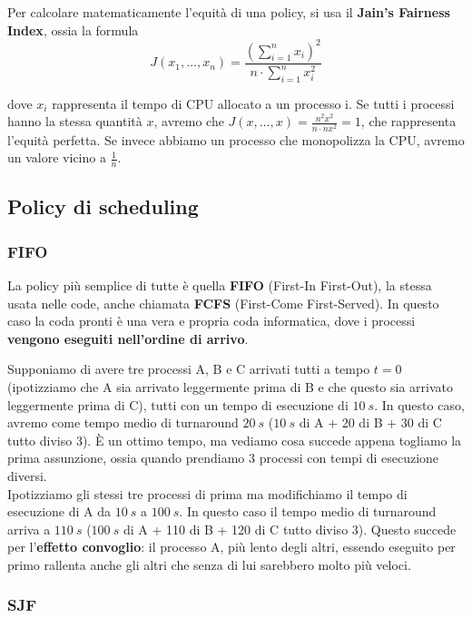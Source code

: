 \documentclass[11pt, a4paper, titlepage, oneside]{scrbook}
\begin{document}
\NB Per calcolare matematicamente l'equità di una policy, si usa il \textbf{Jain's Fairness Index}, ossia la formula
\[
J(x_1, \ldots, x_n) = \frac{(\sum_{i = 1}^n x_i)^2}{n \cdot \sum_{i = 1}^n x_i^2}
\]

dove $x_i$ rappresenta il tempo di CPU allocato a un processo i. Se tutti i processi hanno la stessa quantità $x$, avremo che $J(x, \ldots, x) = \frac{n^2 x^2}{n \cdot n x^2} = 1$, che rappresenta l'equità perfetta. Se invece abbiamo un processo che monopolizza la CPU, avremo un valore vicino a $\frac{1}{n}$.

\subsection{Policy di scheduling}

\subsubsection*{FIFO}

La policy più semplice di tutte è quella \textbf{FIFO} (First-In First-Out), la stessa usata nelle code, anche chiamata \textbf{FCFS} (First-Come First-Served). In questo caso la coda pronti è una vera e propria coda informatica, dove i processi \textbf{vengono eseguiti nell'ordine di arrivo}. 

Supponiamo di avere tre processi A, B e C arrivati tutti a tempo $t = 0$ (ipotizziamo che A sia arrivato leggermente prima di B e che questo sia arrivato leggermente prima di C), tutti con un tempo di esecuzione di $\SI{10}{s}$. In questo caso, avremo come tempo medio di turnaround \textbf{\boldmath$\SI[reset-math-version=false]{20}{s}$} ($\SI{10}{s}$ di A + 20 di B + 30 di C tutto diviso 3). È un ottimo tempo, ma vediamo cosa succede appena togliamo la prima assunzione, ossia quando prendiamo 3 processi con tempi di esecuzione diversi. \\
Ipotizziamo gli stessi tre processi di prima ma modifichiamo il tempo di esecuzione di A da $\SI{10}{s}$ a $\SI{100}{s}$. In questo caso il tempo medio di turnaround arriva a \textbf{\boldmath$\SI[reset-math-version=false]{110}{s}$} ($\SI{100}{s}$ di A + 110 di B + 120 di C tutto diviso 3). Questo succede per l'\textbf{effetto convoglio}: il processo A, più lento degli altri, essendo eseguito per primo rallenta anche gli altri che senza di lui sarebbero molto più veloci.

\subsubsection*{SJF}
\end{document}
